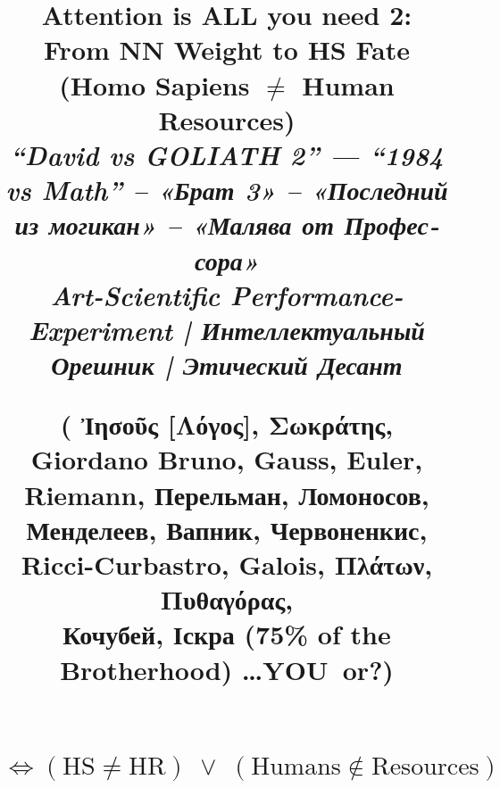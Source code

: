 \documentclass[11pt,a4paper]{article}
\theoremstyle{definition}
\theoremstyle{remark}
\begin{document}
\title{
\vspace{-1.5em}
{\color{titlecolor}\textbf{\LARGE Attention is ALL you need 2:}}\\[0.3cm]
{\color{titlecolor}\textbf{\LARGE From NN Weight to HS Fate}}
{\color{subtitlecolor}\textbf{\large (Homo Sapiens $\neq$ Human Resources)}}\\[0.6cm]

{\large\color{subtitlecolor}\textit{
``David vs GOLIATH 2'' \;---\; ``1984 vs Math'' \;--\;
\foreignlanguage{russian}{«Брат 3»} \;--\;
\foreignlanguage{russian}{«Последний из могикан»} \;--\;
\foreignlanguage{russian}{«Малява от Профессора»}}}\\[0.4cm]

{\normalsize\color{accentcolor}\textit{
  Art-Scientific Performance-Experiment \;|\;
  \foreignlanguage{russian}{Интеллектуальный Орешник} \;|\;
  \foreignlanguage{russian}{Этический Десант}}}\\[0.8cm]

\begin{minipage}{0.95\textwidth}
\centering
{\small\color{subtitlecolor}(
\texorpdfstring{\foreignlanguage{greek}{Ἰησοῦς}}{Jesus}
[\texorpdfstring{\foreignlanguage{greek}{Λόγος}}{Logos}],
\texorpdfstring{\foreignlanguage{greek}{Σωκράτης}}{Socrates},
Giordano Bruno, Gauss, Euler, Riemann,
\texorpdfstring{\foreignlanguage{russian}{Перельман}}{Perelman},
\texorpdfstring{\foreignlanguage{russian}{Ломоносов}}{Lomonosov},
\texorpdfstring{\foreignlanguage{russian}{Менделеев}}{Mendeleev},
\texorpdfstring{\foreignlanguage{russian}{Вапник}}{Vapnik},
\texorpdfstring{\foreignlanguage{russian}{Червоненкис}}{Chervonenkis},
Ricci-Curbastro, Galois,
\texorpdfstring{\foreignlanguage{greek}{Πλάτων}}{Plato},
\texorpdfstring{\foreignlanguage{greek}{Πυθαγόρας}}{Pythagoras},\\[0.2cm]
\foreignlanguage{russian}{Кочубей, Іскра} (75\% of the Brotherhood)\quad
\dots\quad\textbf{YOU}~or?)}
\end{minipage}\\[0.9cm]

{\large\color{accentcolor}
\texorpdfstring{$\iff (\mathrm{HS} \neq \mathrm{HR})
  \;\lor\; (\mathrm{Humans} \notin \mathrm{Resources})$}
{iff (HS != HR) or (Humans not in Resources)}}\\[0.4cm]

}
\end{document}
